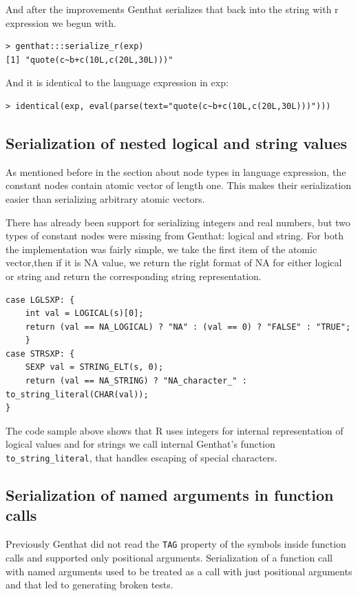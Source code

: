 \documentclass[thesis=B,english]{FITthesis}[2012/10/20]
\begin{document}
And after the improvements Genthat serializes that back into the string with r expression we begun with.

\begin{verbatim}
> genthat:::serialize_r(exp)
[1] "quote(c~b+c(10L,c(20L,30L)))"
\end{verbatim}

And it is identical to the language expression in exp:

\begin{verbatim}
> identical(exp, eval(parse(text="quote(c~b+c(10L,c(20L,30L)))")))
\end{verbatim}


\subsection{Serialization of nested logical and string values}

As mentioned before in the section about node types in language expression, the constant nodes contain atomic vector of length one. This makes their serialization easier than serializing arbitrary atomic vectors.

There has already been support for serializing integers and real numbers, but two types of constant nodes were missing from Genthat: logical and string. For both the implementation was fairly simple, we take the first item of the atomic vector,then if it is NA value, we return the right format of NA for either logical or string and return the corresponding string representation.

\begin{verbatim}
case LGLSXP: {
    int val = LOGICAL(s)[0];
    return (val == NA_LOGICAL) ? "NA" : (val == 0) ? "FALSE" : "TRUE";
    }
case STRSXP: {
    SEXP val = STRING_ELT(s, 0);
    return (val == NA_STRING) ? "NA_character_" : to_string_literal(CHAR(val));
}
\end{verbatim}

The code sample above shows that R uses integers for internal representation of logical values and for strings we call internal Genthat’s function \verb|to_string_literal|, that handles escaping of special characters.


\subsection{Serialization of named arguments in function calls}
Previously Genthat did not read the \verb|TAG| property of the symbols inside function calls and supported only positional arguments. Serialization of a function call with named arguments used to be treated as a call with just positional arguments and that led to generating broken tests.
\end{document}
